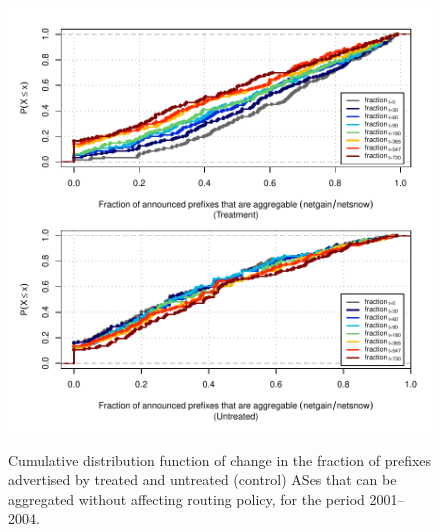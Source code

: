 \begin{figure}[H]
\begin{centering}
\begin{singlespace}
    \includegraphics[width=6in]{figures/behavior-frac_deagg-2001_2004-corr.pdf}
    \vspace{-2em}\\
    \caption{Cumulative distribution function of change in the fraction of
    prefixes advertised by treated and untreated (control) ASes that can be
    aggregated without affecting routing policy, for the period 2001--2004.}
\end{singlespace}
\end{centering}
\end{figure}
